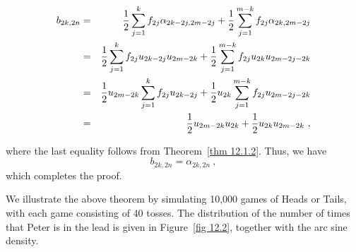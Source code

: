 \begin{theorem}
\begin{eqnarray*}
b_{2k, 2n} &=& {1\over 2} \sum_{j = 1}^k f_{2j}\alpha_{2k-2j, 2m-2j} + 
{1\over 2}\sum_{j = 1}^{m-k} f_{2j}\alpha_{2k, 2m - 2j}\\
&=& {1\over 2}\sum_{j = 1}^k f_{2j}u_{2k-2j}u_{2m-2k} + 
{1\over 2}\sum_{j = 1}^{m-k} f_{2j}u_{2k}u_{2m - 2j - 2k}\\
&=& {1\over 2}u_{2m-2k}\sum_{j = 1}^k f_{2j}u_{2k - 2j} +
{1\over 2}u_{2k}\sum_{j = 1}^{m-k} f_{2j}u_{2m - 2j - 2k}\\
&=& {1\over 2}u_{2m - 2k}u_{2k} + {1\over 2}u_{2k}u_{2m - 2k}\ ,
\end{eqnarray*}

where the last equality follows from Theorem~\ref{thm 12.1.2}.  Thus, we have
$$b_{2k, 2n} = \alpha_{2k, 2n}\ ,$$
which completes the proof.
\end{theorem}
We illustrate the above theorem by simulating 10{,}000 games of Heads or Tails, with each game
consisting of 40 tosses.  The distribution of the number of times that Peter is in the lead is
given in Figure~\ref{fig 12.2}, together with the arc sine density.


